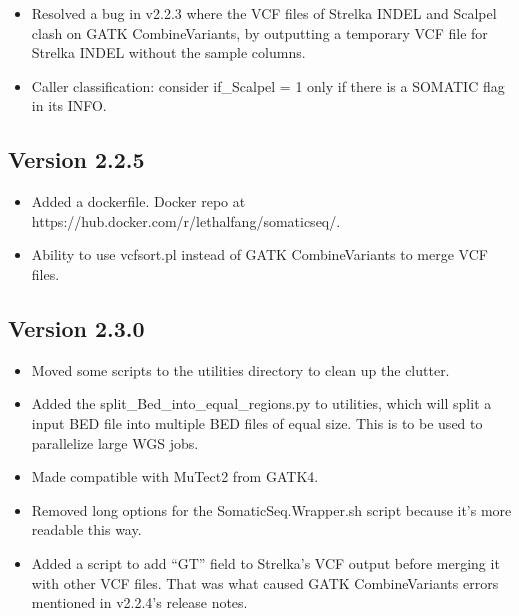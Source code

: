 \documentclass[10pt,letterpaper]{article}
\begin{document}
\begin{sloppypar}
\begin{itemize}

  \item
  Resolved a bug in v2.2.3 where the VCF files of Strelka INDEL and Scalpel clash on GATK CombineVariants, by outputting a temporary VCF file for Strelka INDEL without the sample columns.
  
  \item
  Caller classification: consider if\_Scalpel = 1 only if there is a SOMATIC flag in its INFO. 

\end{itemize}


\subsection{Version 2.2.5}

\begin{itemize}
  
  \item
  Added a dockerfile. Docker repo at https://hub.docker.com/r/lethalfang/somaticseq/. 
  
  \item
  Ability to use vcfsort.pl instead of GATK CombineVariants to merge VCF files.

\end{itemize}


\subsection{Version 2.3.0}

\begin{itemize}
  
  \item
  Moved some scripts to the utilities directory to clean up the clutter.
  
  \item
  Added the split\_Bed\_into\_equal\_regions.py to utilities, which will split a input BED file into multiple BED files of equal size. This is to be used to parallelize large WGS jobs.
  
  \item
  Made compatible with MuTect2 from GATK4.
  
  \item
  Removed long options for the SomaticSeq.Wrapper.sh script because it's more readable this way.
  
  \item
  Added a script to add ``GT'' field to Strelka's VCF output before merging it with other VCF files. That was what caused GATK CombineVariants errors mentioned in v2.2.4's release notes. 
  

\end{itemize}
\end{sloppypar}
\end{document}
